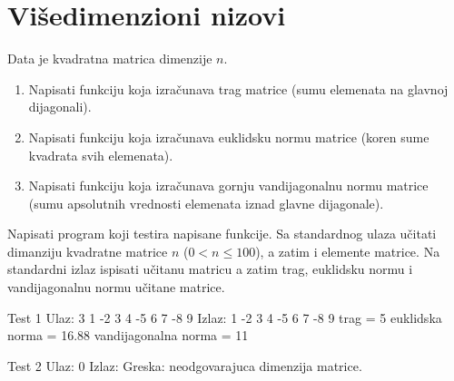 \section{Višedimenzioni nizovi}

\begin{Exercise}[label=314]
Data je kvadratna matrica dimenzije $n$.
\begin{enumerate}
\item Napisati funkciju koja izračunava trag matrice (sumu elemenata na glavnoj dijagonali).
\item Napisati funkciju koja izračunava euklidsku normu matrice (koren sume kvadrata svih elemenata).
\item Napisati funkciju koja izračunava gornju vandijagonalnu normu matrice (sumu apsolutnih vrednosti elemenata iznad glavne dijagonale).
\end{enumerate}
Napisati program koji testira napisane funkcije. Sa standardnog
ulaza učitati dimanziju kvadratne matrice $n$
($0 < n \leq 100$), a zatim i elemente matrice. Na standardni izlaz
ispisati učitanu matricu a zatim trag, euklidsku normu i vandijagonalnu normu 
učitane matrice.

\begin{maxitest}
\begin{test}{Test 1}
Ulaz:  3 1 -2 3 4 -5 6 7 -8 9
Izlaz: 1 -2 3 
       4 -5 6 
       7 -8 9
       trag = 5
       euklidska norma = 16.88
       vandijagonalna norma = 11
\end{test}
\end{maxitest}

\begin{maxitest}
\begin{test}{Test 2}
Ulaz:  0
Izlaz: Greska: neodgovarajuca dimenzija matrice. 
\end{test}
\end{maxitest}
\end{Exercise}
\begin{Answer}[ref=314]
\end{Answer}

